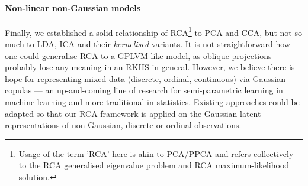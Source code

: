     \paragraph{Non-linear non-Gaussian models}
    Finally, we established a solid relationship of RCA\footnote{Usage of the term 'RCA' here is akin to PCA/PPCA and refers collectively to the RCA generalised eigenvalue problem and RCA maximum-likelihood solution.} to PCA and CCA, but not so much to LDA, ICA and their \emph{kernelised} variants.
    It is not straightforward how one could generalise RCA to a GPLVM-like model, as oblique projections probably lose any meaning in an RKHS in general.
    However, we believe there is hope for representing mixed-data (discrete, ordinal, continuous) via Gaussian copulas --- an up-and-coming line of research for semi-parametric learning in machine learning and more traditional in statistics.
    Existing approaches could be adapted \citep{Hoff:Extending07, Murray:BGCFM11} so that our RCA framework is applied on the Gaussian latent representations of non-Gaussian, discrete or ordinal observations.
    
  
    
%
%
%




